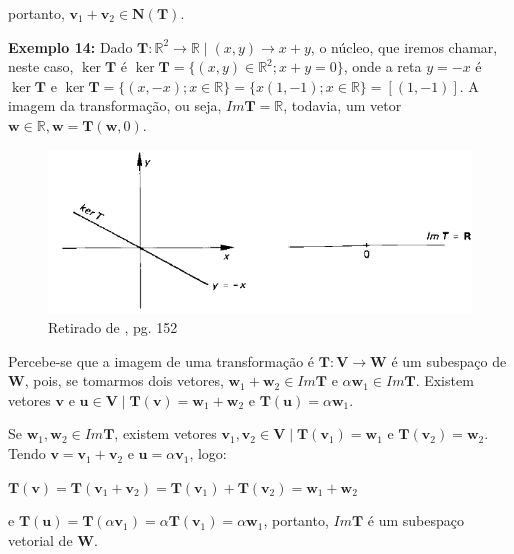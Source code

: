 \noindent portanto, $\mathbf{v}_1 + \mathbf{v}_2 \in \mathbf{N}(\mathbf{T})$. 

\noindent\textbf{Exemplo 14:} Dado $\mathbf{T}: \mathbb{R}^2 \longrightarrow \mathbb{R} \mid (x, y) \rightarrow x + y$, o núcleo, que iremos chamar, neste caso, $\ker\mathbf{T}$ é $\ker\mathbf{T} = \{(x, y) \in \mathbb{R}^2; x + y = 0\}$, onde a reta $y = -x$ é $\ker\mathbf{T}$ e $\ker\mathbf{T} = \{(x, -x); x \in \mathbb{R}\} = \{x(1, -1); x \in \mathbb{R}\} = [(1, -1)]$. A imagem da transformação, ou seja, $Im\mathbf{T} = \mathbb{R}$, todavia, um vetor $\mathbf{w} \in \mathbb{R}, \mathbf{w} = \mathbf{T}(\mathbf{w}, 0)$.

\begin{figure}[H]
	\centering
	\includegraphics[scale=1.00]{t_nucleo2.png}
	\caption{Retirado de \cite{boldrini1980}, pg. 152}
\end{figure}

Percebe-se que a imagem de uma transformação é $\mathbf{T}: \mathbf{V} \longrightarrow \mathbf{W}$ é um subespaço de $\mathbf{W}$, pois, se tomarmos dois vetores, $\mathbf{w}_1 + \mathbf{w}_2 \in Im\mathbf{T}$ e $\alpha\mathbf{w}_1 \in Im\mathbf{T}$. Existem vetores $\mathbf{v}$ e $\mathbf{u} \in \mathbf{V} \mid \mathbf{T}(\mathbf{v}) = \mathbf{w}_1 + \mathbf{w}_2$ e $\mathbf{T}(\mathbf{u}) = \alpha\mathbf{w}_1$.

Se $\mathbf{w}_1, \mathbf{w}_2 \in Im\mathbf{T}$, existem vetores $\mathbf{v}_1, \mathbf{v}_2 \in \mathbf{V} \mid \mathbf{T}(\mathbf{v}_1) = \mathbf{w}_1$ e $\mathbf{T}(\mathbf{v}_2) = \mathbf{w}_2$. Tendo $\mathbf{v} = \mathbf{v}_1 + \mathbf{v}_2$ e $\mathbf{u} = \alpha\mathbf{v}_1$, logo:

\centerline{$\mathbf{T}(\mathbf{v}) = \mathbf{T}(\mathbf{v}_1 + \mathbf{v}_2) = \mathbf{T}(\mathbf{v}_1) + \mathbf{T}(\mathbf{v}_2) = \mathbf{w}_1 + \mathbf{w}_2$} 
\noindent e $\mathbf{T}(\mathbf{u}) = \mathbf{T}(\alpha\mathbf{v}_1) = \alpha\mathbf{T}(\mathbf{v}_1) = \alpha\mathbf{w}_1$, portanto, $Im\mathbf{T}$ é um subespaço vetorial de $\mathbf{W}$.

